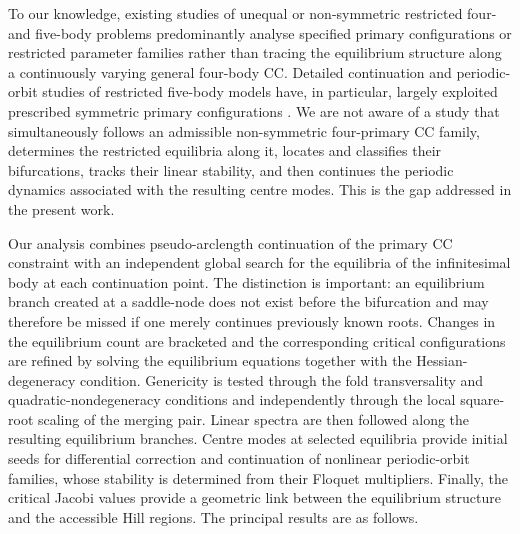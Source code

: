 To our knowledge, existing studies of unequal or non-symmetric restricted four- and five-body problems predominantly analyse specified primary configurations or restricted parameter families rather than tracing the equilibrium structure along a continuously varying general four-body CC. Detailed continuation and periodic-orbit studies of restricted five-body models have, in particular, largely exploited prescribed symmetric primary configurations \cite{ollongren1988,kalvouridis1999,zotospapadakis2019}. We are not aware of a study that simultaneously follows an admissible non-symmetric four-primary CC family, determines the restricted equilibria along it, locates and classifies their bifurcations, tracks their linear stability, and then continues the periodic dynamics associated with the resulting centre modes. This is the gap addressed in the present work.

Our analysis combines pseudo-arclength continuation of the primary CC constraint with an independent global search for the equilibria of the infinitesimal body at each continuation point. The distinction is important: an equilibrium branch created at a saddle-node does not exist before the bifurcation and may therefore be missed if one merely continues previously known roots. Changes in the equilibrium count are bracketed and the corresponding critical configurations are refined by solving the equilibrium equations together with the Hessian-degeneracy condition. Genericity is tested through the fold transversality and quadratic-nondegeneracy conditions and independently through the local square-root scaling of the merging pair. Linear spectra are then followed along the resulting equilibrium branches. Centre modes at selected equilibria provide initial seeds for differential correction and continuation of nonlinear periodic-orbit families, whose stability is determined from their Floquet multipliers. Finally, the critical Jacobi values provide a geometric link between the equilibrium structure and the accessible Hill regions.
The principal results are as follows.


